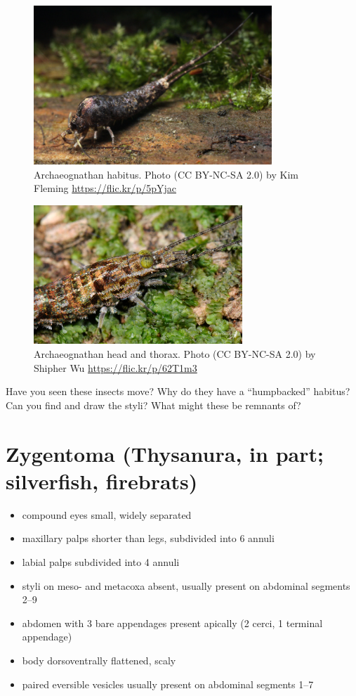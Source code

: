 \documentclass[letterpaper, 11pt]{article}
\begin{document}
\begin{figure}[ht!]
  \centering
    \includegraphics[width=0.8\textwidth]{image01}
  \caption{Archaeognathan habitus. Photo (CC BY-NC-SA 2.0) by Kim Fleming \url{https://flic.kr/p/5pYjac}}
  \label{fig:archhabit}
\end{figure}

\begin{figure}[ht!]
  \centering
    \includegraphics[width=0.7\textwidth]{image34}
  \caption{Archaeognathan head and thorax. Photo (CC BY-NC-SA 2.0) by Shipher Wu \url{https://flic.kr/p/62T1m3}}
  \label{fig:archhead}
\end{figure}

\noindent{}Have you seen these insects move? Why do they have a ``humpbacked'' habitus? Can you find and draw the styli? What might these be remnants of?\vspace{4cm}

\section{Zygentoma (Thysanura, in part; silverfish, firebrats)}

\begin{itemize}
\item compound eyes small, widely separated
\item maxillary palps shorter than legs, subdivided into 6 annuli
\item labial palps subdivided into 4 annuli
\item styli on meso- and metacoxa absent, usually present on abdominal segments 2--9 
\item abdomen with 3 bare appendages present apically (2 cerci, 1 terminal appendage)
\item body dorsoventrally flattened, scaly
\item paired eversible vesicles usually present on abdominal segments 1--7
\end{itemize}
\end{document}
